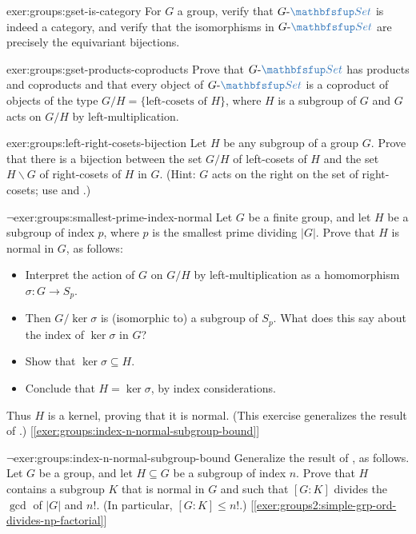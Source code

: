 \begin{exer}{}{exer:groups:gset-is-category}
  For $G$ a group, verify that $G\text{-}\categ{Set}$ is indeed a
  category, and verify that the isomorphisms in $G\text{-}\categ{Set}$
  are precisely the equivariant bijections.
\end{exer}
\begin{exer}{}{exer:groups:gset-products-coproducts}
  Prove that $G\text{-}\categ{Set}$ has products and coproducts and
  that every object of $G\text{-}\categ{Set}$ is a coproduct of
  objects of the type $G/H = \{\text{left-cosets of } H\}$, where $H$
  is a subgroup of $G$ and $G$ acts on $G/H$ by left-multiplication.
\end{exer}
\begin{exer}{}{exer:groups:left-right-cosets-bijection}
  Let $H$ be any subgroup of a group $G$. Prove that there is a
  bijection between the set $G/H$ of left-cosets of $H$ and the set
  $H \backslash G$ of right-cosets of $H$ in $G$. (Hint: $G$ acts on
  the right on the set of right-cosets; use
   and
  .)
\end{exer}
\begin{exer}{$\lnot$}{exer:groups:smallest-prime-index-normal}
  Let $G$ be a finite group, and let $H$ be a subgroup of index $p$,
  where $p$ is the smallest prime dividing $|G|$. Prove that $H$ is
  normal in $G$, as follows:
  \begin{itemize}
  \item Interpret the action of $G$ on $G/H$ by left-multiplication as
    a homomorphism $\sigma : G \to S_p$.
  \item Then $G/\ker\sigma$ is (isomorphic to) a subgroup of
    $S_p$. What does this say about the index of $\ker\sigma$ in $G$?
  \item Show that $\ker\sigma \subseteq H$.
  \item Conclude that $H = \ker\sigma$, by index considerations.
  \end{itemize}
  Thus $H$ is a kernel, proving that it is normal. (This exercise
  generalizes the result of
  .)
  [\ref{exer:groups:index-n-normal-subgroup-bound}]
\end{exer}
\begin{exer}{$\lnot$}{exer:groups:index-n-normal-subgroup-bound}
  Generalize the result of
  , as follows. Let $G$
  be a group, and let $H \subseteq G$ be a subgroup of index
  $n$. Prove that $H$ contains a subgroup $K$ that is normal in $G$
  and such that $[G:K]$ divides the $\gcd$ of $|G|$ and $n!$. (In
  particular, $[G:K] \leq n!$.)
  [\ref{exer:groups2:simple-grp-ord-divides-np-factorial}]
\end{exer}
